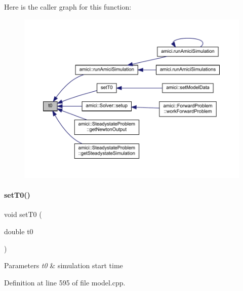 Here is the caller graph for this function\+:
\nopagebreak
\begin{figure}[H]
\begin{center}
\leavevmode
\includegraphics[width=350pt]{classamici_1_1_model_a223e567004c82b5facc2fe98cdd16855_icgraph}
\end{center}
\end{figure}
\mbox{\label{classamici_1_1_model_aaf5053fde7e205c89d89c000a7693987}} 
\paragraph{\texorpdfstring{set\+T0()}{setT0()}}
{\footnotesize\ttfamily void set\+T0 (\begin{DoxyParamCaption}\item[{double}]{t0 }\end{DoxyParamCaption})}


\begin{DoxyParams}{Parameters}
{\em t0} & simulation start time \\
\hline
\end{DoxyParams}


Definition at line 595 of file model.\+cpp.

